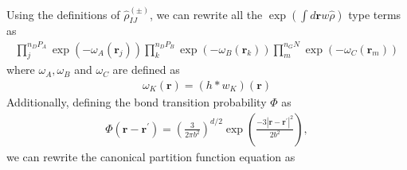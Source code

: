 \documentclass{article}
\begin{document}
  \noindent Using the definitions of $\hat{\rho}_{IJ}^{(\pm)}$, %
    we can rewrite all the $\exp(\int d \mathbf{r} w\hat{\rho})$ type terms as
  \begin{align*}
    \prod_{j}^{n_{D}P_{A}}
    \exp \left( -\omega_A(\mathbf{r}_j) \right)
    \prod_{k}^{n_{D}P_{B}}
    \exp \left( -\omega_B(\mathbf{r}_k) \right)
    \prod_{m}^{n_{G}N_{}}
    \exp \left( -\omega_C(\mathbf{r}_m) \right)
  \end{align*}
  where $\omega_A, \omega_B$ and $\omega_C$ are defined as
  \begin{align*}
    \omega_K(\mathbf{r}) = (h \ast w_K)(\mathbf{r})
  \end{align*}
  Additionally, defining the bond transition probability $\Phi$ as
  \begin{align*}
    \Phi(\mathbf{r} - \mathbf{r}^\prime) =
      \left( \frac{3}{2\pi b^2} \right) ^ {d/2}
      \exp \left( \frac{-3| \mathbf{r} - \mathbf{r}^\prime |^2}{2b^2} \right),
  \end{align*}
  we can rewrite the canonical partition function equation as
\end{document}
